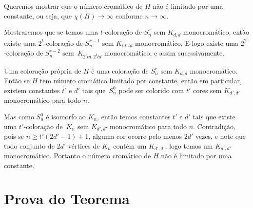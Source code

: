 
Queremos mostrar que o número cromático de $H$ não é limitado por uma constante, ou seja, que $\chi(H) \rightarrow \infty$ conforme $n \rightarrow \infty$.

Mostraremos que se temos uma $t$-coloração de $S_n^r$ sem $K_{d,d}$ monocromático, então existe uma $2^t$-coloração de $S_n^{r-1}$ sem $K_{td,td}$ monocromático. E logo existe uma $2^{2^t}$-coloração de $S_n^{r-2}$ sem~$K_{2^ttd,2^ttd}$ monocromático, e assim sucessivamente.

Uma coloração própria de $H$ é uma coloração de $S_n^r$ sem $K_{d,d}$ monocromático. Então se $H$ tem número cromático limitado por constante, então em particular, existem constantes $t'$ e $d'$ tais que~$S_n^0$ pode ser colorido com $t'$ cores sem $K_{d',d'}$ monocromático para todo $n$.

Mas como $S_n^0$ é isomorfo ao $K_n$, então temos constantes $t'$ e $d'$ tais que existe uma $t'$-coloração de~$K_n$ sem $K_{d',d'}$ monocromático para todo $n$. Contradição, pois se $n \geq t'(2d'-1)+1$, alguma cor ocorre pelo menos $2d'$ vezes, e note que todo conjunto de $2d'$ vértices de $K_n$ contém um $K_{d',d'}$, logo temos um $K_{d',d'}$ monocromático. Portanto o número cromático de $H$ não é limitado por uma constante.



\section{Prova do Teorema}

